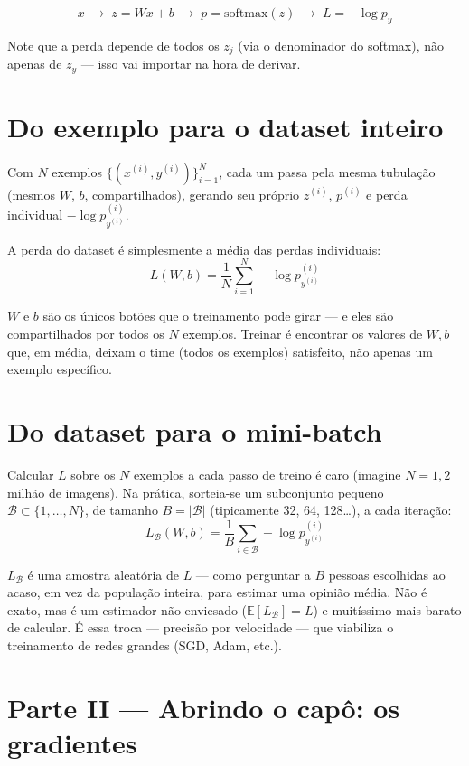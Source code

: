 \documentclass[11pt]{article}
\begin{document}
$$
x \;\longrightarrow\; z = Wx+b \;\longrightarrow\; p = \mathrm{softmax}(z) \;\longrightarrow\; L = -\log p_y
$$

Note que a perda depende de todos os $z_j$ (via o denominador do softmax), não apenas de $z_y$ --- isso vai importar na hora de derivar.

\section{Do exemplo para o dataset inteiro}

Com $N$ exemplos $\{(x^{(i)}, y^{(i)})\}_{i=1}^{N}$, cada um passa pela mesma tubulação (mesmos $W$, $b$, compartilhados), gerando seu próprio $z^{(i)}$, $p^{(i)}$ e perda individual $-\log p_{y^{(i)}}^{(i)}$.

A perda do dataset é simplesmente a média das perdas individuais:
$$
L(W,b) = \frac{1}{N}\sum_{i=1}^{N} -\log p^{(i)}_{y^{(i)}}
$$

\begin{intuicao}
$W$ e $b$ são os únicos botões que o treinamento pode girar --- e eles são compartilhados por todos os $N$ exemplos. Treinar é encontrar os valores de $W, b$ que, em média, deixam o time (todos os exemplos) satisfeito, não apenas um exemplo específico.
\end{intuicao}

\section{Do dataset para o mini-batch}

Calcular $L$ sobre os $N$ exemplos a cada passo de treino é caro (imagine $N=1{,}2$ milhão de imagens). Na prática, sorteia-se um subconjunto pequeno $\mathcal{B} \subset \{1,\dots,N\}$, de tamanho $B=|\mathcal{B}|$ (tipicamente 32, 64, 128\ldots), a cada iteração:
$$
L_{\mathcal{B}}(W,b) = \frac{1}{B}\sum_{i \in \mathcal{B}} -\log p^{(i)}_{y^{(i)}}
$$

\begin{intuicao}
$L_{\mathcal{B}}$ é uma amostra aleatória de $L$ --- como perguntar a $B$ pessoas escolhidas ao acaso, em vez da população inteira, para estimar uma opinião média. Não é exato, mas é um estimador não enviesado ($\mathbb{E}[L_{\mathcal{B}}] = L$) e muitíssimo mais barato de calcular. É essa troca --- precisão por velocidade --- que viabiliza o treinamento de redes grandes (SGD, Adam, etc.).
\end{intuicao}

\section*{Parte II --- Abrindo o capô: os gradientes}
\end{document}
